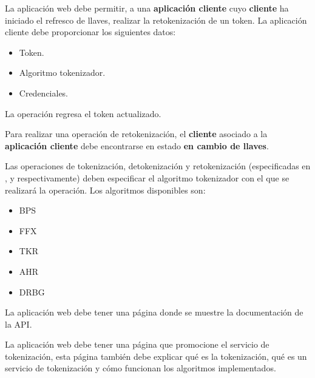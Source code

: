 {
  La aplicación web debe permitir, a una \textbf{aplicación cliente} cuyo
  \textbf{cliente} ha iniciado el refresco de llaves, realizar la retokenización
  de un token. La aplicación cliente debe proporcionar los siguientes datos:
  \begin{itemize}
    \item Token.
    \item Algoritmo tokenizador.
    \item Credenciales.
  \end{itemize}

  \begin{hangparas}{2em}{0}
    La operación regresa el token actualizado.

    {
      Para realizar una operación de retokenización, el \textbf{cliente} asociado
      a la \textbf{aplicación cliente} debe encontrarse en estado \textbf{en
      cambio de llaves}.
    }
  \end{hangparas}
}

{
  Las operaciones de tokenización, detokenización y retokenización
  (especificadas en ,
   y 
  respectivamente) deben especificar el algoritmo tokenizador con el que se
  realizará la operación. Los algoritmos disponibles son:
  \begin{itemize}
    \item BPS
    \item FFX
    \item TKR
    \item AHR
    \item DRBG
  \end{itemize}
}

{
  La aplicación web debe tener una página donde se muestre la documentación de
  la API.
}

{
  La aplicación web debe tener una página que promocione el servicio de
  tokenización, esta página también debe explicar qué es la tokenización, qué es
  un servicio de tokenización y cómo funcionan los algoritmos implementados.
}

